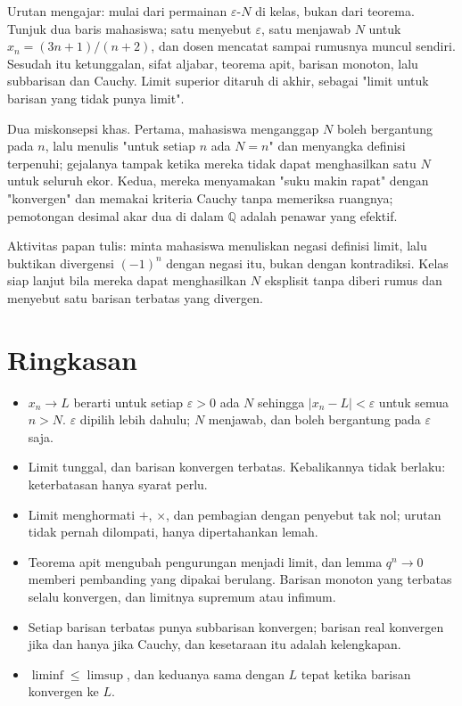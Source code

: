 \begin{untukdosen}
Urutan mengajar: mulai dari permainan $\varepsilon$-$N$ di kelas, bukan dari
teorema. Tunjuk dua baris mahasiswa; satu menyebut $\varepsilon$, satu menjawab $N$
untuk $x_n=(3n+1)/(n+2)$, dan dosen mencatat sampai rumusnya muncul sendiri.
Sesudah itu ketunggalan, sifat aljabar, teorema apit, barisan monoton, lalu
subbarisan dan Cauchy. Limit superior ditaruh di akhir, sebagai "limit untuk
barisan yang tidak punya limit".

Dua miskonsepsi khas. Pertama, mahasiswa menganggap $N$ boleh bergantung pada $n$,
lalu menulis "untuk setiap $n$ ada $N=n$" dan menyangka definisi terpenuhi;
gejalanya tampak ketika mereka tidak dapat menghasilkan satu $N$ untuk seluruh
ekor. Kedua, mereka menyamakan "suku makin rapat" dengan "konvergen" dan memakai
kriteria Cauchy tanpa memeriksa ruangnya; pemotongan desimal akar dua di dalam
$\mathbb{Q}$ adalah penawar yang efektif.

Aktivitas papan tulis: minta mahasiswa menuliskan negasi definisi limit, lalu
buktikan divergensi $(-1)^n$ dengan negasi itu, bukan dengan kontradiksi. Kelas
siap lanjut bila mereka dapat menghasilkan $N$ eksplisit tanpa diberi rumus dan
menyebut satu barisan terbatas yang divergen.
\end{untukdosen}

\section{Ringkasan}

\begin{ringkasan}
\begin{itemize}
  \item $x_n \to L$ berarti untuk setiap $\varepsilon>0$ ada $N$ sehingga
        $|x_n-L|<\varepsilon$ untuk semua $n>N$. $\varepsilon$ dipilih lebih
        dahulu; $N$ menjawab, dan boleh bergantung pada $\varepsilon$ saja.
  \item Limit tunggal, dan barisan konvergen terbatas. Kebalikannya tidak berlaku:
        keterbatasan hanya syarat perlu.
  \item Limit menghormati $+$, $\times$, dan pembagian dengan penyebut tak nol;
        urutan tidak pernah dilompati, hanya dipertahankan lemah.
  \item Teorema apit mengubah pengurungan menjadi limit, dan lemma $q^n \to 0$
        memberi pembanding yang dipakai berulang. Barisan monoton yang terbatas
        selalu konvergen, dan limitnya supremum atau infimum.
  \item Setiap barisan terbatas punya subbarisan konvergen; barisan real konvergen
        jika dan hanya jika Cauchy, dan kesetaraan itu adalah kelengkapan.
  \item $\liminf \le \limsup$, dan keduanya sama dengan $L$ tepat ketika barisan
        konvergen ke $L$.
\end{itemize}
\end{ringkasan}

